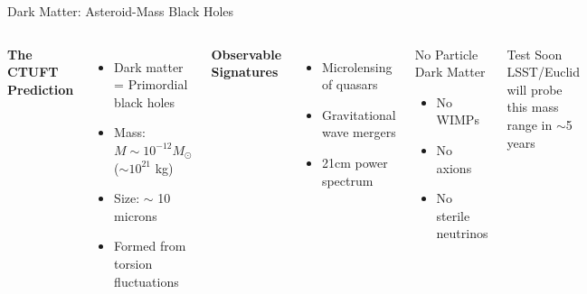 \documentclass[aspectratio=169]{beamer}
\begin{document}
\begin{frame}{Dark Matter: Asteroid-Mass Black Holes}
\begin{columns}
\textbf{The CTUFT Prediction}
\begin{itemize}
    \item Dark matter = Primordial black holes
    \item Mass: $M \sim 10^{-12} M_\odot$ ($\sim 10^{21}$ kg)
    \item Size: $\sim$ 10 microns
    \item Formed from torsion fluctuations
\end{itemize}

\vspace{0.5cm}

\textbf{Observable Signatures}
\begin{itemize}
    \item Microlensing of quasars
    \item Gravitational wave mergers
    \item 21cm power spectrum
\end{itemize}

\begin{block}{No Particle Dark Matter}
\begin{itemize}
    \item No WIMPs
    \item No axions
    \item No sterile neutrinos
\end{itemize}
\end{block}

\begin{alertblock}{Test Soon}
LSST/Euclid will probe this mass range in $\sim$5 years
\end{alertblock}
\end{columns}
\end{frame}
\end{document}
